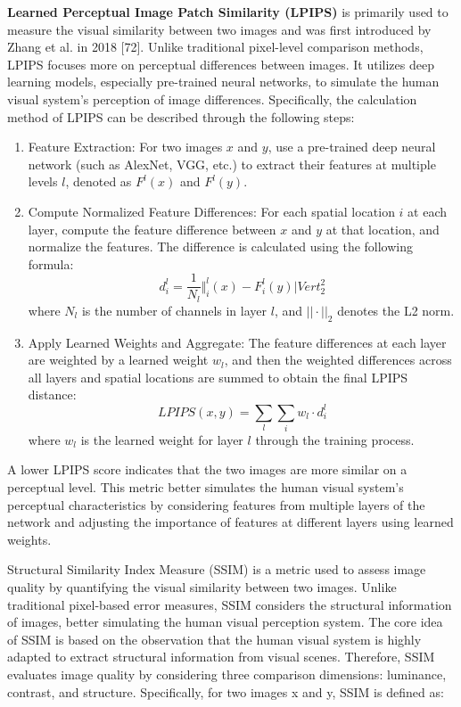 \textbf{Learned Perceptual Image Patch Similarity (LPIPS)} is primarily used to measure the visual similarity between two images and was first introduced by Zhang et al. in 2018 [72]. Unlike traditional pixel-level comparison methods, LPIPS focuses more on perceptual differences between images. It utilizes deep learning models, especially pre-trained neural networks, to simulate the human visual system's perception of image differences. Specifically, the calculation method of LPIPS can be described through the following steps:
\begin{enumerate}
    \item Feature Extraction: For two images $x$ and $y$, use a pre-trained deep neural network (such as AlexNet, VGG, etc.) to extract their features at multiple levels $l$, denoted as $F^l (x)$ and $F^l (y)$.
    \item Compute Normalized Feature Differences: For each spatial location $i$ at each layer, compute the feature difference between $x$ and $y$ at that location, and normalize the features. The difference is calculated using the following formula:
    \begin{equation}
        d_i^l = \frac{1}{N_l} \Vert_i^l(x) - F_i^l(y)|Vert_2^2
    \end{equation}
    where $N_l$ is the number of channels in layer $l$, and $||\cdot||_2$ denotes the L2 norm.
    \item Apply Learned Weights and Aggregate: The feature differences at each layer are weighted by a learned weight $w_l$, and then the weighted differences across all layers and spatial locations are summed to obtain the final LPIPS distance:
    \begin{equation}
        LPIPS(x, y) = \sum_l \sum_i w_l \cdot d_i^l
    \end{equation}
    where $w_l$ is the learned weight for layer $l$ through the training process.
\end{enumerate}

A lower LPIPS score indicates that the two images are more similar on a perceptual level. This metric better simulates the human visual system's perceptual characteristics by considering features from multiple layers of the network and adjusting the importance of features at different layers using learned weights.

\textbf{}{Structural Similarity Index Measure (SSIM)} is a metric used to assess image quality by quantifying the visual similarity between two images. Unlike traditional pixel-based error measures, SSIM considers the structural information of images, better simulating the human visual perception system. The core idea of SSIM is based on the observation that the human visual system is highly adapted to extract structural information from visual scenes. Therefore, SSIM evaluates image quality by considering three comparison dimensions: luminance, contrast, and structure. Specifically, for two images x and y, SSIM is defined as:

